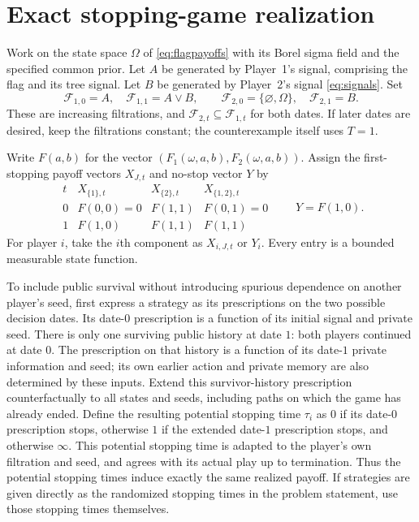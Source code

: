 \documentclass[11pt]{article}
\theoremstyle{remark}
\newcommand{\F}{\mathcal F}
\begin{document}
\section{Exact stopping-game realization}

Work on the state space $\Omega$ of \eqref{eq:flagpayoffs} with its
Borel sigma field and the specified common prior. Let $A$ be generated
by Player~1's signal, comprising the flag and its tree signal. Let $B$
be generated by Player~2's signal \eqref{eq:signals}. Set
\begin{equation}\label{eq:filtrations}
 \F_{1,0}=A,\quad \F_{1,1}=A\vee B,\qquad
 \F_{2,0}=\{\varnothing,\Omega\},\quad \F_{2,1}=B.
\end{equation}
These are increasing filtrations, and
$\F_{2,t}\subseteq\F_{1,t}$ for both dates. If later dates are
desired, keep the filtrations constant; the counterexample itself uses
$T=1$.

Write $F(a,b)$ for the vector
$(F_1(\omega,a,b),F_2(\omega,a,b))$. Assign the first-stopping
payoff vectors $X_{J,t}$ and no-stop vector $Y$ by
\begin{equation}\label{eq:stoppingpayoffs}
\begin{array}{c|ccc}
 t&X_{\{1\},t}&X_{\{2\},t}&X_{\{1,2\},t}\\ \hline
 0&F(0,0)=0&F(1,1)&F(0,1)=0\\
 1&F(1,0)&F(1,1)&F(1,1)
\end{array}
\qquad Y=F(1,0).
\end{equation}
For player $i$, take the $i$th component as $X_{i,J,t}$ or $Y_i$.
Every entry is a bounded measurable state function.

To include public survival without introducing spurious dependence on
another player's seed, first express a strategy as its prescriptions on
the two possible decision dates. Its date-$0$ prescription is a function
of its initial signal and private seed. There is only one surviving public
history at date $1$: both players continued at date $0$. The prescription
on that history is a function of its date-$1$ private information and seed;
its own earlier action and private memory are also determined by these
inputs. Extend this survivor-history prescription counterfactually to all
states and seeds, including paths on which the game has already ended.
Define the resulting potential stopping time $\tau_i$ as $0$ if its
date-$0$ prescription stops, otherwise $1$ if the extended date-$1$
prescription stops, and otherwise $\infty$. This potential stopping time
is adapted to the player's own filtration and seed, and agrees with its
actual play up to termination. Thus the potential stopping times induce
exactly the same realized payoff. If strategies are given directly as the
randomized stopping times in the problem statement, use those stopping
times themselves.
\end{document}
